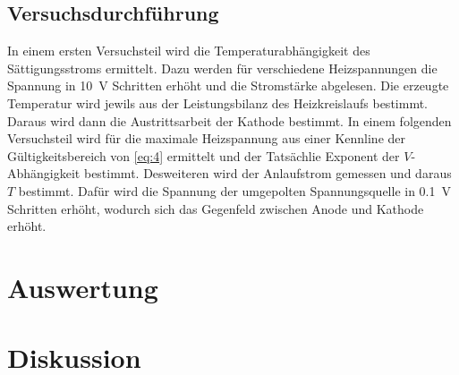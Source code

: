 \subsection{Versuchsdurchführung}
In einem ersten Versuchsteil wird die Temperaturabhängigkeit des Sättigungsstroms ermittelt.
Dazu werden für verschiedene Heizspannungen die Spannung in \SI{10}{\volt} Schritten
erhöht und die Stromstärke abgelesen.
Die erzeugte Temperatur wird jewils aus der Leistungsbilanz des Heizkreislaufs bestimmt.
Daraus wird dann die Austrittsarbeit der Kathode bestimmt.
In einem folgenden Versuchsteil wird für die maximale Heizspannung
aus einer Kennline der Gültigkeitsbereich von \eqref{eq:4} ermittelt und der
Tatsächlie Exponent der $V$-Abhängigkeit bestimmt. Desweiteren wird der Anlaufstrom
gemessen und daraus $T$ bestimmt. Dafür wird die Spannung der umgepolten Spannungsquelle
in \SI{0.1}{\volt} Schritten erhöht, wodurch sich das Gegenfeld zwischen Anode und Kathode
erhöht. 

\section{Auswertung}
\section{Diskussion}
\newpage
\nocite{*}
\printbibliography
